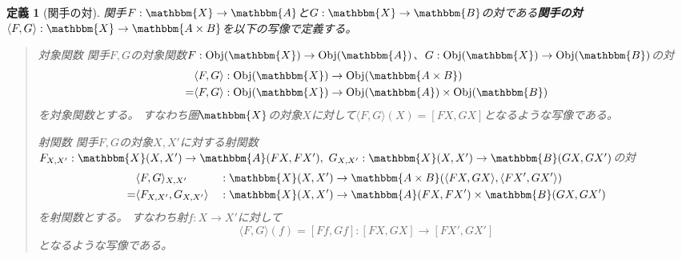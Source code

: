 \documentclass[uplatex,dvipdfmx]{jsarticle}
\newcommand{\cat}[1]{\mathbbm{#1}}
\newcommand{\arrow}{\rightarrow}
\newcommand{\functor}[3]{#1:\cat{#2}\arrow \cat{#3}}
\newcommand{\tuple}[1]{\langle #1\rangle}
\newcommand{\obj}[1]{\mathrm{Obj}(\cat{#1})}
\newcommand{\mor}[3]{#1:#2\arrow #3}
\newcommand{\arset}[3]{\cat{#1}(#2,#3)}
\newcommand{\pcobj}[1]{[#1]}
\newtheorem{define}[proof]{定義}
\numberwithin{proof}{subsection}
\newenvironment{mydescription}
{\begin{description}
  \setlength{\parskip}{0.5cm}
}
{\end{description}}
\begin{document}
	\begin{define}[関手の対]
		関手$\functor{F}{X}{A}$と$\functor{G}{X}{B}$の対である\textbf{関手の対}$\functor{\tuple{F,G}}{X}{A\times B}$を以下の写像で定義する。
		\begin{quote}
			\begin{mydescription}
				\item[対象関数] 関手$F,G$の対象関数$\mor{F}{\obj{X}}{\obj{A}}$、$\mor{G}{\obj{X}}{\obj{B}}$の対
				\begin{align*}
					&\mor{\tuple{F,G}}{\obj{X}}{\obj{A\times B}}\\
					=&\mor{\tuple{F,G}}{\obj{X}}{\obj{A}\times \obj{B}}
				\end{align*}
				を対象関数とする。
				すなわち圏$\cat{X}$の対象$X$に対して$\tuple{F,G}(X)=\pcobj{FX,GX}$となるような写像である。
				\item[射関数]
				関手$F,G$の対象$X,X'$に対する射関数$\mor{F_{X,X'}}{\arset{X}{X}{X'}}{\arset{A}{FX}{FX'}},\ \mor{G_{X,X'}}{\arset{X}{X}{X'}}{\arset{B}{GX}{GX'}}$の対
				\begin{align*}
					&\mor{\tuple{F,G}_{X,X'}&&}{\arset{X}{X}{X'}}{\arset{A\times B}{\tuple{FX,GX}}{\tuple{FX',GX'}}}\\
					=&	\mor{\tuple{F_{X,X'},G_{X,X'}}&&}{\arset{X}{X}{X'}}{\arset{A}{FX}{FX'}\times\arset{B}{GX}{GX'}}
				\end{align*}
				を射関数とする。
				すなわち射$\mor{f}{X}{X'}$に対して\[\mor{\tuple{F,G}(f)=\pcobj{Ff,Gf}}{\pcobj{FX,GX}}{\pcobj{FX',GX'}}\]となるような写像である。


\end{mydescription}
\end{quote}
\end{define}
\end{document}
